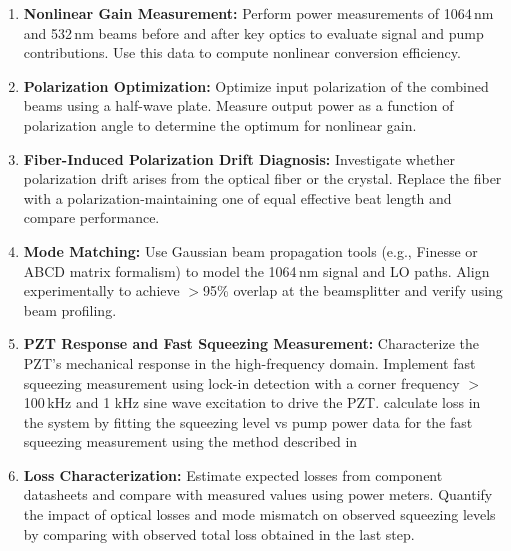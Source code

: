 \documentclass[colorlinks=true,pdfstartview=FitV,linkcolor=blue,
citecolor=red,urlcolor=magenta]{ligodoc}
\begin{document}
\begin{enumerate}
    \item \textbf{Nonlinear Gain Measurement:}  
    Perform power measurements of 1064\,nm and 532\,nm beams before and after key optics to evaluate signal and pump contributions. Use this data to compute nonlinear conversion efficiency.

    \item \textbf{Polarization Optimization:}  
    Optimize input polarization of the combined beams using a half-wave plate. Measure output power as a function of polarization angle to determine the optimum for nonlinear gain.

    \item \textbf{Fiber-Induced Polarization Drift Diagnosis:}  
    Investigate whether polarization drift arises from the optical fiber or the crystal. Replace the fiber with a polarization-maintaining one of equal effective beat length and compare performance.

    \item \textbf{Mode Matching:}  
    Use Gaussian beam propagation tools (e.g., Finesse or ABCD matrix formalism) to model the 1064\,nm signal and LO paths. Align experimentally to achieve $>$95\% overlap at the beamsplitter and verify using beam profiling.

    \item \textbf{PZT Response and Fast Squeezing Measurement:}  
    Characterize the PZT’s mechanical response in the high-frequency domain. Implement fast squeezing measurement using lock-in detection with a corner frequency $>$100\,kHz and 1 kHz sine wave excitation to drive the PZT. calculate loss in the system by fitting the squeezing level vs pump power data for the fast squeezing measurement using the method described in \cite{tse}

    \item \textbf{Loss Characterization:}  
    Estimate expected losses from component datasheets and compare with measured values using power meters. Quantify the impact of optical losses and mode mismatch on observed squeezing levels by comparing with observed total loss obtained in the last step.
\end{enumerate}
\end{document}
